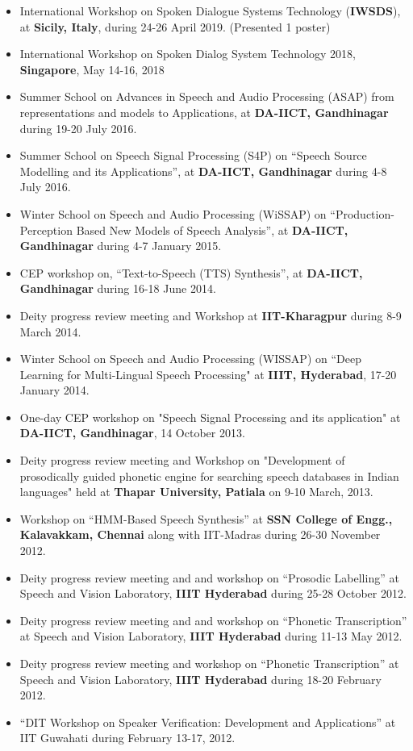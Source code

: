 \documentclass[10pt]{article}
\begin{document}
\begin{itemize}
			\setlength\itemsep{0.15em}
\item International Workshop on Spoken Dialogue Systems Technology (\textbf{IWSDS}),  at \textbf{Sicily, Italy}, during 24-26 April 2019. (Presented 1 poster)
\item International Workshop on Spoken Dialog System Technology 2018, \textbf{Singapore}, May 14-16, 2018
\item Summer School on Advances in Speech and Audio Processing (ASAP) from representations and models to Applications, at \textbf{DA-IICT, Gandhinagar} during 19-20 July 2016.
\item Summer School on Speech Signal Processing (S4P) on ``Speech Source Modelling and its Applications'', at \textbf{DA-IICT, Gandhinagar} during 4-8 July 2016.
\item Winter School on Speech and Audio Processing (WiSSAP) on ``Production-Perception Based New Models of Speech Analysis'', at \textbf{DA-IICT, Gandhinagar} during 4-7 January 2015.
\item CEP workshop on, ``Text-to-Speech (TTS) Synthesis'', at \textbf{DA-IICT, Gandhinagar} during 16-18 June 2014.
\item Deity progress review meeting and Workshop at \textbf{IIT-Kharagpur} during 8-9 March 2014.
\item Winter School on Speech and Audio Processing (WISSAP) on ``Deep Learning for Multi-Lingual Speech Processing" at \textbf{IIIT, Hyderabad}, 17-20 January 2014.
\item One-day CEP workshop on "Speech Signal Processing and its application" at \textbf{DA-IICT, Gandhinagar}, 14  October 2013.
\item Deity progress review meeting and Workshop on "Development of prosodically guided phonetic engine for 
searching speech databases in Indian languages" held at \textbf{Thapar University, Patiala} on 9-10 March, 2013.
\item Workshop on ``HMM-Based Speech Synthesis'' at \textbf{SSN College of Engg., Kalavakkam, Chennai} along with IIT-Madras during 26-30 November 2012. 

\item Deity progress review meeting and and workshop on ``Prosodic Labelling''  at Speech and Vision Laboratory, \textbf{IIIT Hyderabad} during 
25-28 October 2012.
\item Deity progress review meeting and and workshop on ``Phonetic Transcription''  at Speech and Vision Laboratory, \textbf{IIIT Hyderabad} during 
11-13 May 2012.
\item Deity progress review meeting and workshop on ``Phonetic Transcription'' at Speech and Vision Laboratory, \textbf{IIIT Hyderabad} during  18-20 February 2012.
\item ``DIT Workshop on Speaker Verification: Development and Applications'' at IIT Guwahati during February 13-17, 2012.
\end{itemize}
\end{document}
